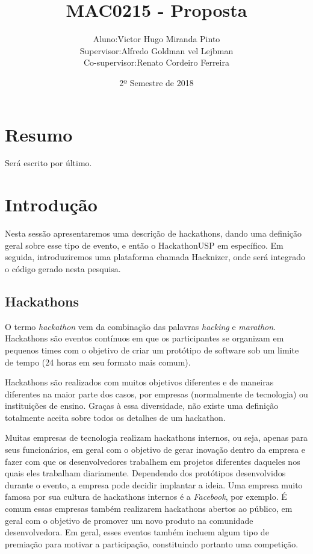 \documentclass[10pt,twoside,a4paper]{article}
\title{MAC0215 - Proposta}
\author{
  \begin{tabular}{rl}
    Aluno:      & Victor Hugo Miranda Pinto \\
    Supervisor: & Alfredo Goldman vel Lejbman \\
    Co-supervisor: & Renato Cordeiro Ferreira
  \end{tabular}
}
\date{2º Semestre de 2018}
\begin{document}
\onehalfspacing

\maketitle

\section{Resumo}
  Será escrito por último.

\section{Introdução}

  Nesta sessão apresentaremos uma descrição de hackathons, dando uma definição geral sobre esse tipo de evento, e então o HackathonUSP em específico. Em seguida, introduziremos uma plataforma chamada Hacknizer, onde será integrado o código gerado nesta pesquisa.

  \subsection{Hackathons}
  
    O termo \textit{hackathon} vem da combinação das palavras \textit{hacking} e \textit{marathon}. Hackathons são eventos contínuos em que os participantes se organizam em pequenos times com o objetivo de criar um protótipo de software sob um limite de tempo (24 horas em seu formato mais comum). \cite{Komssi2015WhatFor}
    
    Hackathons são realizados com muitos objetivos diferentes e de maneiras diferentes na maior parte dos casos, por empresas (normalmente de tecnologia) ou instituições de ensino. Graças à essa diversidade, não existe uma definição totalmente aceita sobre todos os detalhes de um hackathon.
    
    Muitas empresas de tecnologia realizam hackathons internos, ou seja, apenas para seus funcionários, em geral com o objetivo de gerar inovação dentro da empresa e fazer com que os desenvolvedores trabalhem em projetos diferentes daqueles nos quais eles trabalham diariamente. Dependendo dos protótipos desenvolvidos durante o evento, a empresa pode decidir implantar a ideia. Uma empresa muito famosa por sua cultura de hackathons internos é a \textit{Facebook}, por exemplo. É comum essas empresas também realizarem hackathons abertos ao público, em geral com o objetivo de promover um novo produto na comunidade desenvolvedora. Em geral, esses eventos também incluem algum tipo de premiação para motivar a participação, constituindo portanto uma competição.
    
\end{document}
